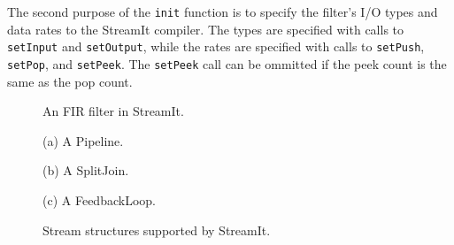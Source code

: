 The second purpose of the {\tt init} function is to specify the
filter's I/O types and data rates to the StreamIt compiler.  The types
are specified with calls to {\tt setInput} and {\tt setOutput}, while
the rates are specified with calls to {\tt setPush}, {\tt setPop}, and
{\tt setPeek}.  The {\tt setPeek} call can be ommitted if the peek
count is the same as the pop count.



\begin{figure}[!t]
\begin{minipage}{3in}
\vspace{10pt}
\caption{\protect\small An FIR filter in StreamIt.~~~~~
\protect\label{fig:firstreamit}}
\end{minipage}
\begin{minipage}{3in}
\centering
\vspace{10pt}

(a) A Pipeline. \\
\vspace{10pt}

(b) A SplitJoin. \\
\vspace{10pt}

(c) A FeedbackLoop. \\
\caption{\protect\small Stream structures supported by StreamIt.
\protect\label{fig:structuresp}
}
\end{minipage}
\end{figure}


